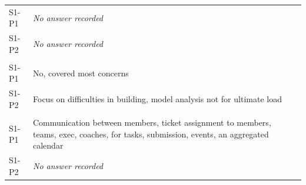 \begin{longtable}{@{}L{1.3cm} p{\dimexpr\linewidth-1.3cm-2\tabcolsep\relax}@{}}
S1-P1 & \textit{No answer recorded} \\
S1-P2 & \textit{No answer recorded} \\
\addlinespace
{} \\*
S1-P1 & No, covered most concerns \\
S1-P2 & Focus on difficulties in building, model analysis not for ultimate load \\
\addlinespace
{} \\*
S1-P1 & Communication between members, ticket assignment to members, teams, exec, coaches, for tasks, submission, events, an aggregated calendar \\
S1-P2 & \textit{No answer recorded} \\
\end{longtable}
